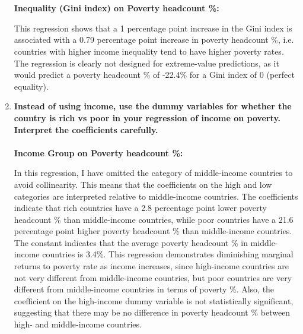 \documentclass[12pt]{article}
\begin{document}
\begin{enumerate}
    \\\\
    \textbf{Inequality (Gini index) on Poverty headcount \%:}
    \footnotesize
    
    \normalsize
    This regression shows that a 1 percentage point increase in the Gini index is associated with a 0.79 percentage point increase in poverty headcount \%, i.e. countries with higher income inequality tend to have higher poverty rates. The regression is clearly not designed for extreme-value predictions, as it would predict a poverty headcount \% of -22.4\% for a Gini index of 0 (perfect equality).

    \item \textbf{Instead of using income, use the dummy variables for whether the country is rich vs poor in your regression of income on poverty. Interpret the coefficients carefully.}
    \\\\
    \textbf{Income Group on Poverty headcount \%:}
    \footnotesize
    
    \normalsize
    In this regression, I have omitted the category of middle-income countries to avoid collinearity. This means that the coefficients on the high and low categories are interpreted relative to middle-income countries. The coefficients indicate that rich countries have a 2.8 percentage point lower poverty headcount \% than middle-income countries, while poor countries have a 21.6 percentage point higher poverty headcount \% than middle-income countries. The constant indicates that the average poverty headcount \% in middle-income countries is 3.4\%. This regression demonstrates diminishing marginal returns to poverty rate as income increases, since high-income countries are not very different from middle-income countries, but poor countries are very different from middle-income countries in terms of poverty \%. Also, the coefficient on the high-income dummy variable is not statistically significant, suggesting that there may be no difference in poverty headcount \% between high- and middle-income countries.


\end{enumerate}
\end{document}
